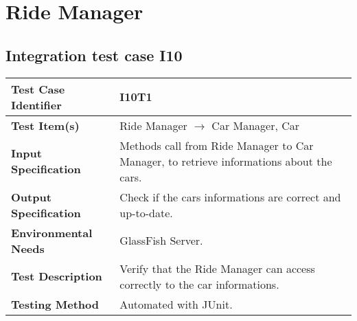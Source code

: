 \section{Ride Manager}
\subsection{Integration test case I10}

\begin{tabular}{l p{}}
    \hline
    \textbf{Test Case Identifier} & I10T1\\
    \hline
    \textbf{Test Item(s)} & Ride Manager $\rightarrow$ Car Manager, Car\\
    \hline
    \textbf{Input Specification} & Methods call from Ride Manager to Car Manager, to retrieve informations about the cars.\\
    \hline
    \textbf{Output Specification} & Check if the cars informations are correct and up-to-date.\\
    \hline
    \textbf{Environmental Needs} & GlassFish Server. \\
    \hline
    \textbf{Test Description} & Verify that the Ride Manager can access correctly to the car informations.\\
    \hline
    \textbf{Testing Method} & Automated with JUnit.\\
    \hline
\end{tabular}